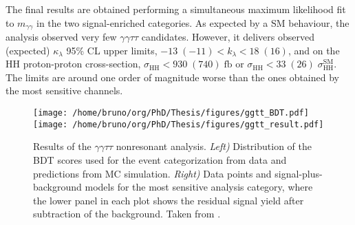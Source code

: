 \documentclass[11pt]{article}
\newcommand{\kl}{\kappa_{\lambda}}
\newcommand{\mgg}{m_{\gamma\gamma}}
\begin{document}
The final results are obtained performing a simultaneous maximum likelihood fit to \(\mgg\) in the two signal-enriched categories.
As expected by a SM behaviour, the analysis observed very few \(\gamma \gamma \tau \tau\) candidates.
However, it delivers observed (expected) \(\kl\) 95\% \ac{CL} upper limits, \(-13\;(-11) < k_{\lambda} < 18\;(16)\), and on the HH proton-proton cross-section, \(\sigma_{\text{HH}} < 930\;(740)\;\si{\femto\barn}\) or \(\sigma_{\text{HH}} < 33\;(26)\;\sigma_{\text{HH}}^{\text{SM}}\).
The limits are around one order of magnitude worse than the ones obtained by the most sensitive channels.

\begin{figure}
\texttt{[image: /home/bruno/org/PhD/Thesis/figures/ggtt\_BDT.pdf]}
\texttt{[image: /home/bruno/org/PhD/Thesis/figures/ggtt\_result.pdf]}
\caption{\label{fig:ggtt_results}Results of the \(\gamma \gamma \tau \tau\) nonresonant analysis. \emph{Left)} Distribution of the BDT scores used for the event categorization from data and predictions from MC simulation. \emph{Right)} Data points and signal-plus-background models for the most sensitive analysis category, where the lower panel in each plot shows the residual signal yield after subtraction of the background. Taken from \cite{gammagammatautau}.}
\end{figure}
\end{document}
